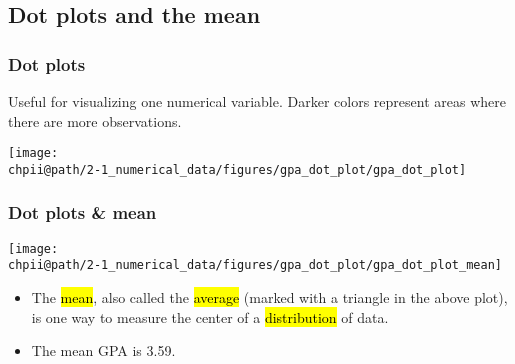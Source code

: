 \documentclass[slidestop,compress,mathserif]{beamer}
\makeatletter
\def\chpii@path{../../Chp 2}
\makeatother
\begin{document}

\subsection{Dot plots and the mean}


\begin{frame}
\frametitle{Dot plots}

Useful for visualizing one numerical variable. Darker colors represent areas where there are more observations.

\begin{center}
\texttt{[image: \\chpii@path/2-1\_numerical\_data/figures/gpa\_dot\_plot/gpa\_dot\_plot]}
\end{center}


\end{frame}



\begin{frame}
\frametitle{Dot plots \& mean}

\begin{center}
\texttt{[image: \\chpii@path/2-1\_numerical\_data/figures/gpa\_dot\_plot/gpa\_dot\_plot\_mean]}
\end{center}

\begin{itemize}

\item The \hl{mean}, also called the \hl{average} (marked with a triangle in the above plot), is one way to measure the center of a \hl{distribution} of data.

\item The mean GPA is 3.59.

\end{itemize} 

\end{frame}

\end{document}
